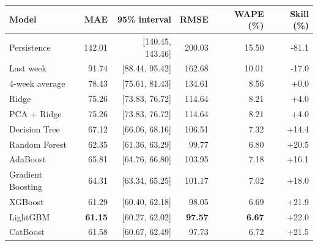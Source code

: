 \begin{tabular}{lrrrrr}
\toprule
Model & MAE & 95\% interval & RMSE & WAPE (\%) & Skill (\%) \\
\midrule
Persistence & 142.01 & {\small [140.45, 143.46]} & 200.03 & 15.50 & -81.1 \\
Last week & 91.74 & {\small [88.44, 95.42]} & 162.68 & 10.01 & -17.0 \\
4-week average & 78.43 & {\small [75.61, 81.43]} & 134.61 & 8.56 & +0.0 \\
\midrule
Ridge & 75.26 & {\small [73.83, 76.72]} & 114.64 & 8.21 & +4.0 \\
PCA + Ridge & 75.26 & {\small [73.83, 76.72]} & 114.64 & 8.21 & +4.0 \\
Decision Tree & 67.12 & {\small [66.06, 68.16]} & 106.51 & 7.32 & +14.4 \\
Random Forest & 62.35 & {\small [61.36, 63.29]} & 99.77 & 6.80 & +20.5 \\
AdaBoost & 65.81 & {\small [64.76, 66.80]} & 103.95 & 7.18 & +16.1 \\
Gradient Boosting & 64.31 & {\small [63.34, 65.25]} & 101.17 & 7.02 & +18.0 \\
XGBoost & 61.29 & {\small [60.40, 62.18]} & 98.05 & 6.69 & +21.9 \\
LightGBM & \textbf{61.15} & {\small [60.27, 62.02]} & \textbf{97.57} & \textbf{6.67} & +22.0 \\
CatBoost & 61.58 & {\small [60.67, 62.49]} & 97.73 & 6.72 & +21.5 \\
\bottomrule
\end{tabular}
